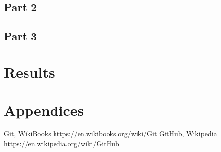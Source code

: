 \documentclass[12pt]{article}
\begin{document}
\subsection{Part 2}




\subsection{Part 3}







\section{Results}

\section{Appendices}

\newpage

\begin{thebibliography}{9} 
 Git, WikiBooks \url{https://en.wikibooks.org/wiki/Git}
 GitHub, Wikipedia \url{https://en.wikipedia.org/wiki/GitHub}
\end{thebibliography} 
\end{document}
